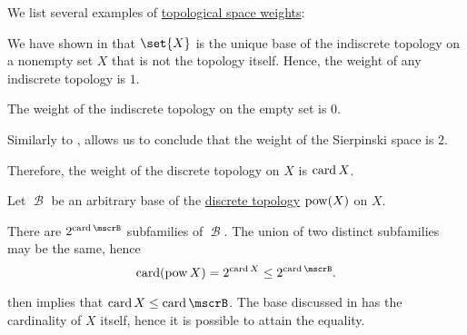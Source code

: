 \begin{example}\label{ex:def:topological_space_weight}
  We list several examples of \hyperref[def:topological_space_weight]{topological space weights}:
  \begin{thmenum}
     We have shown in  that \( \set{ X } \) is the unique base of the indiscrete topology on a nonempty set \( X \) that is not the topology itself. Hence, the weight of any indiscrete topology is \( 1 \).

    The weight of the indiscrete topology on the empty set is \( 0 \).

     Similarly to ,  allows us to conclude that the weight of the Sierpinski space is \( 2 \).

     Therefore, the weight of the discrete topology on \( X \) is \( \operatorname{card} X \).

    Let \( \mscrB \) be an arbitrary base of the \hyperref[def:discrete_topology]{discrete topology} \( \operatorname{pow}(X) \) on \( X \).

    There are \( 2^{\card \mscrB} \) subfamilies of \( \mscrB \). The union of two distinct subfamilies may be the same, hence
    \begin{equation*}
      \card(\pow X) = 2^{\card X} \leq 2^{\card \mscrB}.
    \end{equation*}

     then implies that \( \card X \leq \card \mscrB \). The base discussed in  has the cardinality of \( X \) itself, hence it is possible to attain the equality.
  \end{thmenum}
\end{example}


